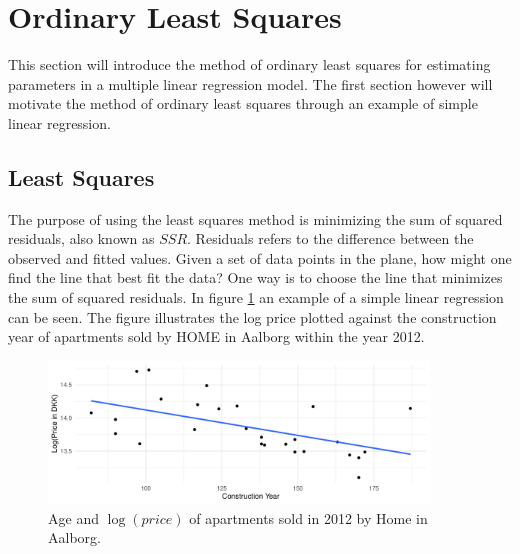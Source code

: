 \section{Ordinary Least Squares}
This section will introduce the method of ordinary least squares for estimating parameters in a multiple linear regression model.
The first section however will motivate the method of ordinary least squares through an example of simple linear regression.

\subsection{Least Squares}
The purpose of using the least squares method is minimizing the sum of squared residuals, also known as $SSR$.
Residuals refers to the difference between the observed and fitted values.
Given a set of data points in the plane, how might one find the line that best fit the data? 
One way is to choose the line that minimizes the sum of squared residuals.
In figure \ref{fig:example_simple_linear_regression} an example of a simple linear regression can be seen. 
The figure illustrates the log price plotted against the construction year of apartments sold by HOME in Aalborg within the year 2012.

\begin{figure}[h]
    \centering
    \includegraphics[width = 0.9\textwidth]{figures/Ordinary_Least_Squares/example_linear_regression.pdf}
    \caption{Age and $\log(price)$ of apartments sold in 2012 by Home in Aalborg.}
    \label{fig:example_simple_linear_regression}
\end{figure}


